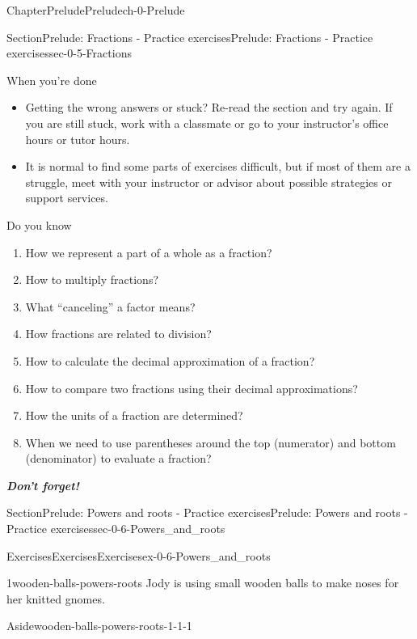 \documentclass[twoside,11pt,]{book}
\newcommand{\alert}[1]{\textbf{\textit{#1}}}
\numberwithin{equation}{section}
\begin{document}
\begin{chapterptx}{Chapter}{Prelude}{}{Prelude}{}{}{ch-0-Prelude}
\begin{sectionptx}{Section}{Prelude: Fractions - Practice exercises}{}{Prelude: Fractions - Practice exercises}{}{}{sec-0-5-Fractions}
\begin{conclusion}{When you're done \textellipsis{}}
\begin{itemize}[label=\textbullet]
\item{}Getting the wrong answers or stuck? Re-read the section and try again. If you are still stuck, work with a classmate or go to your instructor's office hours or tutor hours.%
\item{}It is normal to find some parts of exercises difficult, but if most of them are a struggle, meet with your instructor or advisor about possible strategies or support services.%
\end{itemize}
%
\end{conclusion}%
\begin{conclusion}{Do you know \textellipsis{}}%
%
\begin{enumerate}[label={\Alph*.}]
\item{}How we represent a part of a whole as a fraction?%
\item{}How to multiply fractions?%
\item{}What ``canceling'' a factor means?%
\item{}How fractions are related to division?%
\item{}How to calculate the decimal approximation of a fraction?%
\item{}How to compare two fractions using their decimal approximations?%
\item{}How the units of a fraction are determined?%
\item{}When we need to use parentheses around the top (numerator) and bottom (denominator) to evaluate a fraction?%
\end{enumerate}
%
\par
\alert{Don't forget!}%
\end{conclusion}%
\end{sectionptx}
%
%
\typeout{************************************************}
\typeout{************************************************}
%
\begin{sectionptx}{Section}{Prelude: Powers and roots - Practice exercises}{}{Prelude: Powers and roots - Practice exercises}{}{}{sec-0-6-Powers_and_roots}
%
%
\typeout{************************************************}
\typeout{************************************************}
%
\begin{exercises-subsection-numberless}{Exercises}{Exercises}{}{Exercises}{}{}{ex-0-6-Powers_and_roots}
\begin{divisionexercise}{1}{}{}{wooden-balls-powers-roots}%
Jody is using small wooden balls to make noses for her knitted gnomes. \begin{aside}{Aside}{}{wooden-balls-powers-roots-1-1-1}%

\end{aside}
\end{divisionexercise}
\end{exercises-subsection-numberless}
\end{sectionptx}
\end{chapterptx}
\end{document}
